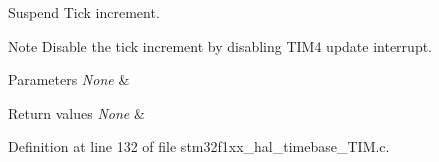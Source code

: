 Suspend Tick increment. 

\begin{DoxyNote}{Note}
Disable the tick increment by disabling T\+I\+M4 update interrupt. 
\end{DoxyNote}

\begin{DoxyParams}{Parameters}
{\em None} & \\
\hline
\end{DoxyParams}

\begin{DoxyRetVals}{Return values}
{\em None} & \\
\hline
\end{DoxyRetVals}


Definition at line 132 of file stm32f1xx\+\_\+hal\+\_\+timebase\+\_\+\+T\+I\+M.\+c.

